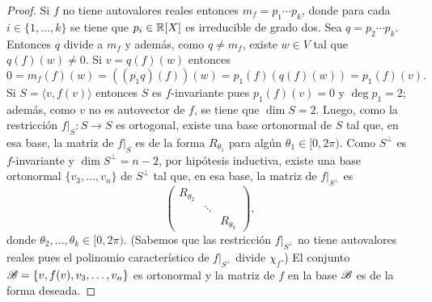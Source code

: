 \begin{thm}
\begin{proof}
        Si $f$ no tiene autovalores reales entonces $m_f=p_1\cdots p_k$, donde
        para cada $i\in\{1,\dots,k\}$ se tiene que $p_i\in\mathbb{R}[X]$ es irreducible
        de grado dos. Sea $q=p_2\cdots p_k$. Entonces $q$ divide a $m_f$ y
        además, como $q\ne m_f$, existe $w\in V$ tal que $q(f)(w)\ne0$. Si
        $v=q(f)(w)$ entonces 
        \[
        0=m_f(f)(w)=((p_1q)(f))(w)=p_1(f)(q(f)(w))=p_1(f)(v).
        \]
        Si $S=\langle v,f(v)\rangle$ entonces $S$ es $f$-invariante pues
        $p_1(f)(v)=0$ y $\deg p_1=2$; además, como $v$ no es autovector de $f$,
        se tiene que $\dim S=2$. Luego, como la restricción $f|_S\colon S\to S$ es
        ortogonal, existe una base ortonormal de $S$ tal que, en esa base, la
        matriz de $f|_S$ es de la forma $R_{\theta_1}$ para algún $\theta_1\in[0,2\pi)$.
        Como $S^\perp$ es $f$-invariante y $\dim S^\perp=n-2$, por hipótesis
        inductiva, existe una base ortonormal $\{v_3,\dots,v_n\}$ de $S^\perp$
        tal que, en esa base, la matriz de $f|_{S^\perp}$ es
        \[
        \begin{pmatrix}
            R_{\theta_2}\\
            &\ddots\\
            &&R_{\theta_k}
        \end{pmatrix},
        \]
        donde $\theta_2,\dots,\theta_k\in[0,2\pi)$. (Sabemos que las
        restricción $f|_{S^\perp}$ no tiene autovalores reales pues el
        polinomio característico de $f|_{S^\perp}$ divide $\chi_f$.) 
        El conjunto $\mathscr{B}=\{v,f(v),v_3,\dots,v_n\}$ es ortonormal y la matriz de
        $f$ en la base $\mathscr{B}$ es de la forma deseada.
    \end{proof}
\end{thm}
 
